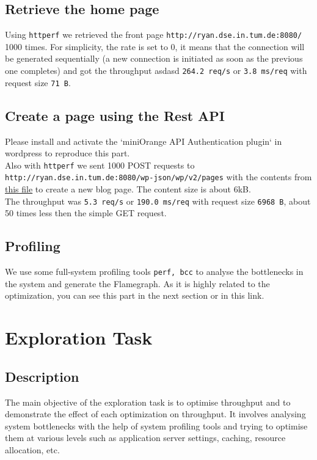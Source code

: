 \subsection{Retrieve the home page}

Using \texttt{httperf} we retrieved the front page \texttt{http://ryan.dse.in.tum.de:8080/} 1000 times. For simplicity, the rate is set to 0, it means that the connection will be generated sequentially (a new connection is initiated as soon as the previous one completes) and got the throughput asdasd \texttt{264.2 req/s} or \texttt{3.8 ms/req} with request size \texttt{71 B}.

\subsection{Create a page using the Rest API}

Please install and activate the `miniOrange API Authentication plugin` in wordpress to reproduce this part. \\
Also with \texttt{httperf} we sent 1000 POST requests to \texttt{http://ryan.dse.in.tum.de:8080/wp-json/wp/v2/pages} with the contents from \href{https://github.com/danbachar/swiss-knife/blob/master/task1/benchmark/bench2_content}{this file} to create a new blog page. The content size is about 6kB.\\
The throughput was \texttt{5.3 req/s} or \texttt{190.0 ms/req} with request size \texttt{6968 B}, about 50 times less then the simple GET request.

\subsection{Profiling}
We use some full-system profiling tools \texttt{perf, bcc} to analyse the bottlenecks in the system and generate the Flamegraph. As it is highly related to the optimization, you can see this part in the next section or in this link.

\section{Exploration Task}

\subsection{Description}

The main objective of the exploration task is to optimise throughput and to demonstrate the effect of each optimization on throughput. It involves analysing system bottlenecks with the help of system profiling tools and trying to optimise them at various levels such as application server settings, caching, resource allocation, etc.

